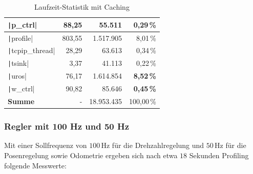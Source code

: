 \begin{table}[H]
{{\begin{minipage}[b]{0.50\hsize}
\begin{tabular}{|l|r|r|r|}
        \texttt|p_ctrl| & 88,25 & 55.511 & \textbf{0,29\,\%} \\ \hline
        \texttt|profile| & 803,55 & 1.517.905 & 8,01\,\% \\ \hline
        \texttt|tcpip_thread| & 28,29 & 63.613 & 0,34\,\% \\ \hline
        \texttt|tsink| & 3,37 & 41.113 & 0,22\,\% \\ \hline
        \texttt|uros| & 76,17 & 1.614.854 & \textbf{8,52\,\%} \\ \hline
        \texttt|w_ctrl| & 90,82 & 85.646 & \textbf{0,45\,\%} \\ \hline
        \hline
        \textbf{Summe} & - & 18.953.435 & 100,00\,\% \\ \hline
        \end{tabular}
        \caption{Laufzeit-Statistik mit Caching}
    \end{minipage}
}}
\end{table}

\subsubsection{Regler mit 100 Hz und 50 Hz}

Mit einer Sollfrequenz von $100\,\text{Hz}$ für die Drehzahlregelung und $50\,\text{Hz}$ für
die Posenregelung sowie Odometrie ergeben sich nach etwa $18$ Sekunden Profiling
folgende Messwerte:

